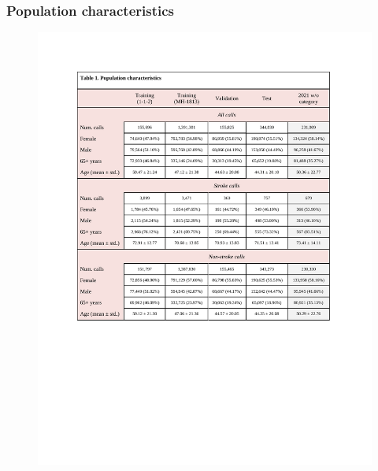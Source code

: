\begin{frame}
    \frametitle{Population characteristics}
    \begin{figure}
        \centering
        \includegraphics[width=0.3\paperwidth]{../graphics/paper_retrospective/table1.pdf}
    \end{figure}
\end{frame}


